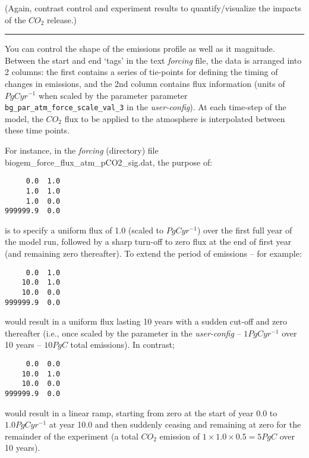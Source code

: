 \documentclass[11pt,fleqn]{book} %
\begin{document}
\noindent (Again, contrast control and experiment results to quantify/visualize the impacts of the \(CO_{2}\) release.)

\vspace{1mm}
\noindent\rule{4cm}{0.1mm}
\vspace{2mm}

\noindent You can control the shape of the emissions profile as well as it magnitude. Between the start and end ‘tags’ in the text \textit{forcing} file, the data is arranged into 2 columns: the first contains a series of tie-points for defining the timing of changes in emissions, and the 2nd column contains flux information (units of \(PgC yr^{-1}\) when scaled by the parameter parameter \texttt{bg\_par\_atm\_force\_scale\_val\_3} in the \textit{user-config}). At each time-step of the model, the \(CO_{2}\) flux to be applied to the atmosphere is interpolated between these time points.

\pagebreak

For instance, in the \textit{forcing} (directory) file \footnotesize\textsf{biogem\_force\_flux\_atm\_pCO2\_sig.dat}\normalsize, the purpose of:
\vspace{-2pt}\begin{verbatim}
     0.0  1.0
     1.0  1.0
     1.0  0.0
999999.9  0.0
\end{verbatim}\vspace{-2pt}
is to specify a uniform flux of 1.0 (scaled to \(PgC yr^{-1}\)) over the first full year of the model run, followed by a sharp turn-off to zero flux at the end of first year (and remaining zero thereafter). To extend the period of emissions – for example:
\vspace{-2pt}\begin{verbatim}
     0.0  1.0
    10.0  1.0
    10.0  0.0
999999.9  0.0
\end{verbatim}\vspace{-2pt}
would result in a uniform flux lasting 10 years with a sudden cut-off and zero thereafter (i.e., once scaled by the parameter in the \textit{user-config} – \(1 PgC yr^{-1}\) over 10 years – \(10 PgC\) total emissions). In contrast; \vspace{-2pt}\begin{verbatim}
     0.0  0.0
    10.0  1.0
    10.0  0.0
999999.9  0.0
\end{verbatim}\vspace{-2pt}
would result in a linear ramp, starting from zero at the start of year \(0.0\) to \(1.0 PgC yr^{-1}\) at year 10.0 and then suddenly ceasing and remaining at zero for the remainder of the experiment (a total \(CO_{2}\) emission of \(1\times1.0\times0.5 = 5PgC\) over 10 years).
\end{document}
